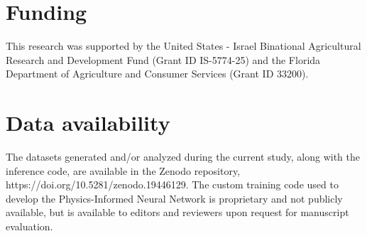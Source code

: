 \documentclass[pdflatex,sn-nature]{sn-jnl}%
\theoremstyle{thmstyleone}%
\theoremstyle{thmstyletwo}%
\theoremstyle{thmstylethree}%
\begin{document}
\section*{Funding}
This research was supported by the United States - Israel Binational Agricultural Research and Development Fund (Grant ID IS-5774-25) and the Florida Department of Agriculture and Consumer Services (Grant ID 33200).

\section*{Data availability}
The datasets generated and/or analyzed during the current study, along with the inference code, are available in the Zenodo repository, https://doi.org/10.5281/zenodo.19446129. The custom training code used to develop the Physics-Informed Neural Network is proprietary and not publicly available, but is available to editors and reviewers upon request for manuscript evaluation.

\end{document}
